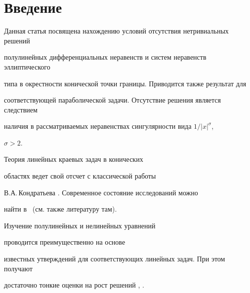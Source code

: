 \date{}




\pagestyle{plain} %







\maketitle


\label{begin}











\section*{Введение}





Данная статья посвящена нахождению условий отсутствия нетривиальных решений


полулинейных дифференциальных неравенств и систем неравенств эллиптического


типа в окрестности конической точки границы. Приводится также результат для


соответствующей параболической задачи. Отсутствие решения является следствием


наличия в рассматриваемых неравенствах сингулярности вида $1/|x|^\sigma$,


$\sigma>2$.





Теория линейных краевых задач в конических 


областях ведет свой отсчет с классической работы 


В.А.\,Кондратьева \cite{Kon1}. Современное состояние исследований можно


найти в~\cite{Cone1} (см. также литературу там).


Изучение полулинейных и нелинейных уравнений 


проводится преимущественно на основе


известных утверждений для соответствующих линейных задач. При этом получают


достаточно тонкие оценки на рост решений \cite{Kon2}, \cite{Konkov1}.


